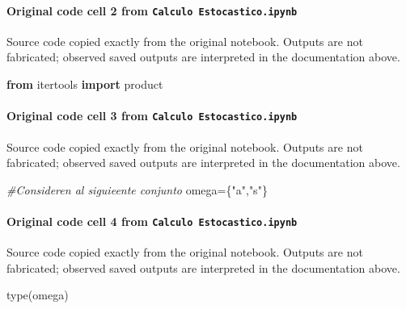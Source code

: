 \documentclass[
  11pt,
]{article}
\newenvironment{Shaded}{}{}
\newcommand{\BuiltInTok}[1]{\textcolor[rgb]{0.00,0.50,0.00}{#1}}
\newcommand{\CommentTok}[1]{\textcolor[rgb]{0.38,0.63,0.69}{\textit{#1}}}
\newcommand{\ImportTok}[1]{\textcolor[rgb]{0.00,0.50,0.00}{\textbf{#1}}}
\newcommand{\NormalTok}[1]{#1}
\newcommand{\OperatorTok}[1]{\textcolor[rgb]{0.40,0.40,0.40}{#1}}
\newcommand{\StringTok}[1]{\textcolor[rgb]{0.25,0.44,0.63}{#1}}
\begin{document}
\paragraph{\texorpdfstring{Original code cell 2 from \texttt{Calculo\ Estocastico.ipynb}}{Original code cell 2 from Calculo Estocastico.ipynb}}\label{original-code-cell-2-from-calculo-estocasticoipynb}

Source code copied exactly from the original notebook. Outputs are not fabricated; observed saved outputs are interpreted in the documentation above.

\begin{Shaded}
\begin{Highlighting}[]
\ImportTok{from}\NormalTok{ itertools }\ImportTok{import}\NormalTok{ product}
\end{Highlighting}
\end{Shaded}

\paragraph{\texorpdfstring{Original code cell 3 from \texttt{Calculo\ Estocastico.ipynb}}{Original code cell 3 from Calculo Estocastico.ipynb}}\label{original-code-cell-3-from-calculo-estocasticoipynb}

Source code copied exactly from the original notebook. Outputs are not fabricated; observed saved outputs are interpreted in the documentation above.

\begin{Shaded}
\begin{Highlighting}[]
\CommentTok{\#Consideren al siguieente conjunto}
\NormalTok{omega}\OperatorTok{=}\NormalTok{\{}\StringTok{"a"}\NormalTok{,}\StringTok{"s"}\NormalTok{\}}
\end{Highlighting}
\end{Shaded}

\paragraph{\texorpdfstring{Original code cell 4 from \texttt{Calculo\ Estocastico.ipynb}}{Original code cell 4 from Calculo Estocastico.ipynb}}\label{original-code-cell-4-from-calculo-estocasticoipynb}

Source code copied exactly from the original notebook. Outputs are not fabricated; observed saved outputs are interpreted in the documentation above.

\begin{Shaded}
\begin{Highlighting}[]
\BuiltInTok{type}\NormalTok{(omega)}
\end{Highlighting}
\end{Shaded}
\end{document}
